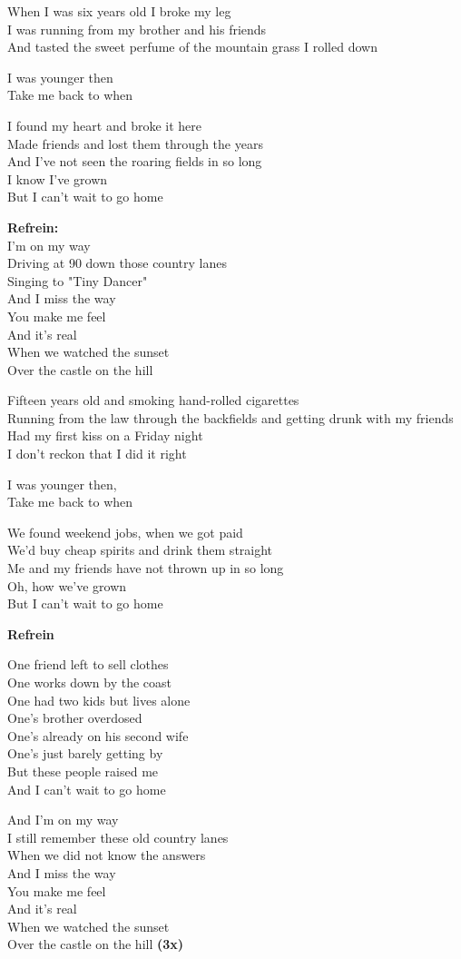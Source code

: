 When I was six years old I broke my leg\\
I was running from my brother and his friends\\
And tasted the sweet perfume of the mountain grass I rolled down

I was younger then\\
Take me back to when

I found my heart and broke it here\\
Made friends and lost them through the years\\
And I've not seen the roaring fields in so long\\
I know I've grown\\
But I can't wait to go home

\textbf{Refrein:}\\
I'm on my way\\
Driving at 90 down those country lanes\\
Singing to "Tiny Dancer"\\
And I miss the way\\
You make me feel\\
And it's real\\
When we watched the sunset\\
Over the castle on the hill

Fifteen years old and smoking hand-rolled cigarettes\\
Running from the law through the backfields and getting drunk with my friends\\
Had my first kiss on a Friday night\\
I don't reckon that I did it right

I was younger then,\\
Take me back to when

We found weekend jobs, when we got paid\\
We'd buy cheap spirits and drink them straight\\
Me and my friends have not thrown up in so long\\
Oh, how we've grown\\
But I can't wait to go home

\textbf{Refrein}

One friend left to sell clothes\\
One works down by the coast\\
One had two kids but lives alone\\
One's brother overdosed\\
One's already on his second wife\\
One's just barely getting by\\
But these people raised me\\
And I can't wait to go home

And I'm on my way\\
I still remember these old country lanes\\
When we did not know the answers\\
And I miss the way\\
You make me feel\\
And it's real\\
When we watched the sunset\\
Over the castle on the hill \textbf{(3x)}\\
